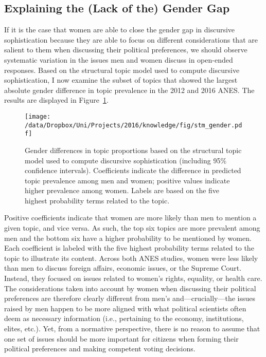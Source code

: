 \subsection{Explaining the (Lack of the) Gender Gap}
If it is the case that women are able to close the gender gap in discursive sophistication because they are able to focus on different considerations that are salient to them when discussing their political preferences, we should observe systematic variation in the issues men and women discuss in open-ended responses. Based on the structural topic model used to compute discursive sophistication, I now examine the subset of topics that showed the largest absolute gender difference in topic prevalence in the 2012 and 2016 ANES. The results are displayed in Figure~\ref{fig:stm_gender}.

\begin{figure}[h]\centering
\texttt{[image: /data/Dropbox/Uni/Projects/2016/knowledge/fig/stm\_gender.pdf]}
\caption{Gender differences in topic proportions based on the structural topic model used to compute discursive sophistication (including 95\% confidence intervals). Coefficients indicate the difference in predicted topic prevalence among men and women; positive values indicate higher prevalence among women. Labels are based on the five highest probability terms related to the topic.
}\label{fig:stm_gender}
\end{figure}

Positive coefficients indicate that women are more likely than men to mention a given topic, and vice versa. As such, the top six topics are more prevalent among men and the bottom six have a higher probability to be mentioned by women. Each coefficient is labeled with the five highest probability terms related to the topic to illustrate its content. Across both ANES studies, women were less likely than men to discuss foreign affairs, economic issues, or the Supreme Court. Instead, they focused on issues related to women's rights, equality, or health care. The considerations taken into account by women when discussing their political preferences are therefore clearly different from men's and---crucially---the issues raised by men happen to be more aligned with what political scientists often deem as necessary information (i.e., pertaining to the economy, institutions, elites, etc.). Yet, from a normative perspective, there is no reason to assume that one set of issues should be more important for citizens when forming their political preferences and making competent voting decisions.



